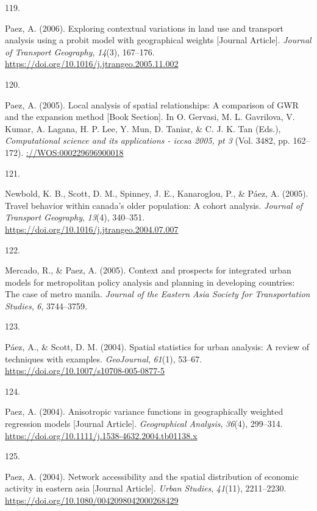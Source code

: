 \documentclass[11pt,a4paper,]{awesome-cv}
\newlength{\csllabelwidth}
\newcommand{\CSLLeftMargin}[1]{\parbox[t]{\csllabelwidth}{#1}}
\newcommand{\CSLRightInline}[1]{\parbox[t]{\linewidth - \csllabelwidth}{#1}}
\begin{document}
\leavevmode{}%
\CSLLeftMargin{119. }
\CSLRightInline{Paez, A. (2006). Exploring contextual variations in land
use and transport analysis using a probit model with geographical
weights {[}Journal Article{]}. \emph{Journal of Transport Geography},
\emph{14}(3), 167--176.
\url{https://doi.org/10.1016/j.jtrangeo.2005.11.002}}

\leavevmode{}%
\CSLLeftMargin{120. }
\CSLRightInline{Paez, A. (2005). Local analysis of spatial
relationships: A comparison of GWR and the expansion method {[}Book
Section{]}. In O. Gervasi, M. L. Gavrilova, V. Kumar, A. Lagana, H. P.
Lee, Y. Mun, D. Taniar, \& C. J. K. Tan (Eds.), \emph{Computational
science and its applications - iccsa 2005, pt 3} (Vol. 3482, pp.
162--172). \url{://WOS:000229696900018}}

\leavevmode{}%
\CSLLeftMargin{121. }
\CSLRightInline{Newbold, K. B., Scott, D. M., Spinney, J. E.,
Kanaroglou, P., \& Páez, A. (2005). Travel behavior within canada's
older population: A cohort analysis. \emph{Journal of Transport
Geography}, \emph{13}(4), 340--351.
\url{https://doi.org/10.1016/j.jtrangeo.2004.07.007}}

\leavevmode{}%
\CSLLeftMargin{122. }
\CSLRightInline{Mercado, R., \& Paez, A. (2005). Context and prospects
for integrated urban models for metropolitan policy analysis and
planning in developing countries: The case of metro manila.
\emph{Journal of the Eastern Asia Society for Transportation Studies},
\emph{6}, 3744--3759.}

\leavevmode{}%
\CSLLeftMargin{123. }
\CSLRightInline{Páez, A., \& Scott, D. M. (2004). Spatial statistics for
urban analysis: A review of techniques with examples. \emph{GeoJournal},
\emph{61}(1), 53--67. \url{https://doi.org/10.1007/s10708-005-0877-5}}

\leavevmode{}%
\CSLLeftMargin{124. }
\CSLRightInline{Paez, A. (2004). Anisotropic variance functions in
geographically weighted regression models {[}Journal Article{]}.
\emph{Geographical Analysis}, \emph{36}(4), 299--314.
\url{https://doi.org/10.1111/j.1538-4632.2004.tb01138.x}}

\leavevmode{}%
\CSLLeftMargin{125. }
\CSLRightInline{Paez, A. (2004). Network accessibility and the spatial
distribution of economic activity in eastern asia {[}Journal Article{]}.
\emph{Urban Studies}, \emph{41}(11), 2211--2230.
\url{https://doi.org/10.1080/0042098042000268429}}
\end{document}
